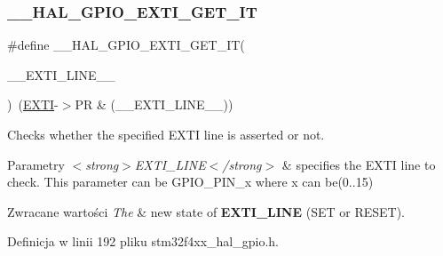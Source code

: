 \mbox{\label{group___g_p_i_o___exported___macros_ga27f0e1f6c38745169d74620f6a178a94}} 
\subsubsection{\texorpdfstring{\+\_\+\+\_\+\+H\+A\+L\+\_\+\+G\+P\+I\+O\+\_\+\+E\+X\+T\+I\+\_\+\+G\+E\+T\+\_\+\+IT}{\_\_HAL\_GPIO\_EXTI\_GET\_IT}}
{\footnotesize\ttfamily \#define \+\_\+\+\_\+\+H\+A\+L\+\_\+\+G\+P\+I\+O\+\_\+\+E\+X\+T\+I\+\_\+\+G\+E\+T\+\_\+\+IT(\begin{DoxyParamCaption}\item[{}]{\+\_\+\+\_\+\+E\+X\+T\+I\+\_\+\+L\+I\+N\+E\+\_\+\+\_\+ }\end{DoxyParamCaption})~(\hyperlink{group___peripheral__declaration_ga9189e770cd9b63dadd36683eb9843cac}{E\+X\+TI}-\/$>$PR \& (\+\_\+\+\_\+\+E\+X\+T\+I\+\_\+\+L\+I\+N\+E\+\_\+\+\_\+))}



Checks whether the specified E\+X\+TI line is asserted or not. 


\begin{DoxyParams}{Parametry}
{\em $<$strong$>$\+E\+X\+T\+I\+\_\+\+L\+I\+N\+E$<$/strong$>$} & specifies the E\+X\+TI line to check. This parameter can be G\+P\+I\+O\+\_\+\+P\+I\+N\+\_\+x where x can be(0..15) \\
\hline
\end{DoxyParams}

\begin{DoxyRetVals}{Zwracane wartości}
{\em The} & new state of {\bfseries E\+X\+T\+I\+\_\+\+L\+I\+NE} (S\+ET or R\+E\+S\+ET). \\
\hline
\end{DoxyRetVals}


Definicja w linii 192 pliku stm32f4xx\+\_\+hal\+\_\+gpio.\+h.

